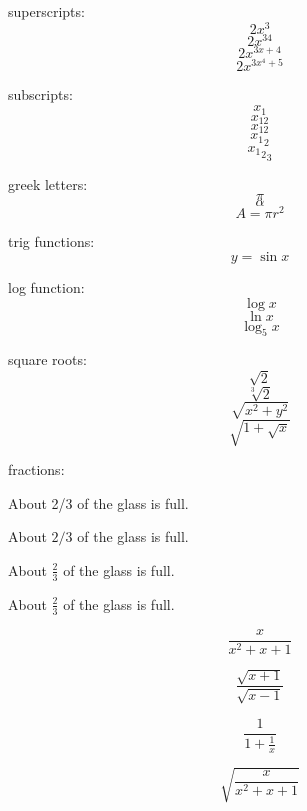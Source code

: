 \documentclass[11pt]{article}
\begin{document}
superscripts: $$2x^3$$
$$2x^{34}$$
$$2x^{3x+4}$$
$$2x^{3x^4+5}$$

subscripts:
$$x_1$$
$$x_{12}$$
$$x_12$$
$${x_1}_2$$
$${{x_1}_2}_3$$

greek letters:
$$\pi$$
$$\alpha$$
$$A=\pi r^2$$

trig functions:
$$y=\sin{x}$$

log function:
$$\log{x}$$
$$\ln{x}$$
$$\log_5{x}$$

square roots:
$$\sqrt{2}$$
$$\sqrt[3]{2}$$
$$\sqrt{x^2+y^2}$$
$$\sqrt{1+\sqrt{x}}$$

fractions:

About 2/3 of the glass is full.

About $2/3$ of the glass is full.

About $\frac{2}{3}$ of the glass is full.

About $\displaystyle{\frac{2}{3}}$ of the glass is full.

$$\frac{x}{x^2+x+1}$$

$$\frac{\sqrt{x+1}}{\sqrt{x-1}}$$

$$\frac{1}{1+\frac{1}{x}}$$

$$\sqrt{\frac{x}{x^2+x+1}}$$
\end{document}
